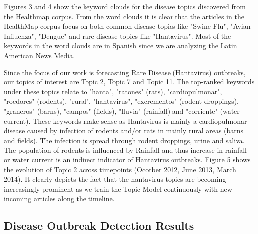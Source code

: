 \documentclass[conference]{IEEEtran}
\begin{document}
Figures 3 and 4 show the keyword clouds for the disease topics discovered from the Healthmap corpus.
From the word clouds it is clear that the articles in the HealthMap corpus focus
on both common disease topics like "Swine Flu", "Avian Influenza", "Dengue" and rare disease topics
like "Hantavirus". Most of the keywords in the word clouds are in Spanish since 
we are analyzing the Latin American News Media.   

Since the focus of our work is forecasting Rare Disease (Hantavirus) outbreaks, 
our topics of interest are Topic 2, Topic 7 and Topic 11. The top-ranked keywords 
under these topics relate to "hanta", "ratones" (rats), "cardiopulmonar", "roedores" (rodents), "rural", 
"hantavirus", "excrementos" (rodent droppings), "graneros" (barns),
"campos" (fields), "lluvia" (rainfall) and "corriente" (water current). These keywords make 
sense as Hantavirus is mainly a cardiopulmonar disease caused by infection of rodents and/or rats 
in mainly rural areas (barns and fields). The infection is spread through rodent droppings, urine and saliva.
The population of rodents is influenced by Rainfall and 
thus increase in rainfall or water current is an indirect indicator of Hantavirus outbreaks.
Figure 5 shows the evolution of Topic 2 across timepoints (Ocotber
2012, June 2013, March 2014). It clearly depicts the fact that the hantavirus topics are becoming increasingly 
prominent as we train the Topic Model continuously with new incoming articles along the timeline.


\subsection{Disease Outbreak Detection Results}
\end{document}
